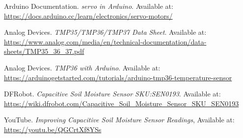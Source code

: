 \documentclass[a4paper,11pt]{article}
\begin{document}
\begin{thebibliography}{9}

Arduino Documentation. \textit{servo in Arduino}. Available at: \url{https://docs.arduino.cc/learn/electronics/servo-motors/}

Analog Devices. \textit{TMP35/TMP36/TMP37 Data Sheet}. Available at: \url{https://www.analog.com/media/en/technical-documentation/data-sheets/TMP35_36_37.pdf}

Analog Devices. \textit{TMP36 with Arduino}. Available at: \url{https://arduinogetstarted.com/tutorials/arduino-tmp36-temperature-sensor}

DFRobot. \textit{Capacitive Soil Moisture Sensor SKU:SEN0193}. Available at: \url{https://wiki.dfrobot.com/Capacitive_Soil_Moisture_Sensor_SKU_SEN0193}

YouTube. \textit{Improving Capacitive Soil Moisture Sensor Readings}, Available at: \url{https://youtu.be/QGCrtXf8YSs}

\end{thebibliography}
\end{document}
